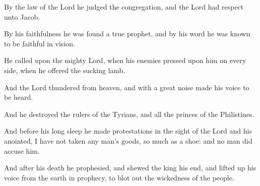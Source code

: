 {\par }{\PP {}By the law of the Lord he judged the congregation, and the Lord had respect unto Jacob.
\par }{\PP {}By his faithfulness he was found a true prophet, and by his word he was known to be faithful in vision.
\par }{\PP {}He called upon the mighty Lord, when his enemies pressed upon him on every side, when he offered the sucking lamb.
\par }{\PP {}And the Lord thundered from heaven, and with a great noise made his voice to be heard.
\par }{\PP {}And he destroyed the rulers of the Tyrians, and all the princes of the Philistines.
\par }{\PP {}And before his long sleep he made protestations in the sight of the Lord and his anointed, I have not taken any man’s goods, so much as a shoe: and no man did accuse him.
\par }{\PP {}And after his death he prophesied, and shewed the king his end, and lifted up his voice from the earth in prophecy, to blot out the wickedness of the people.

}
